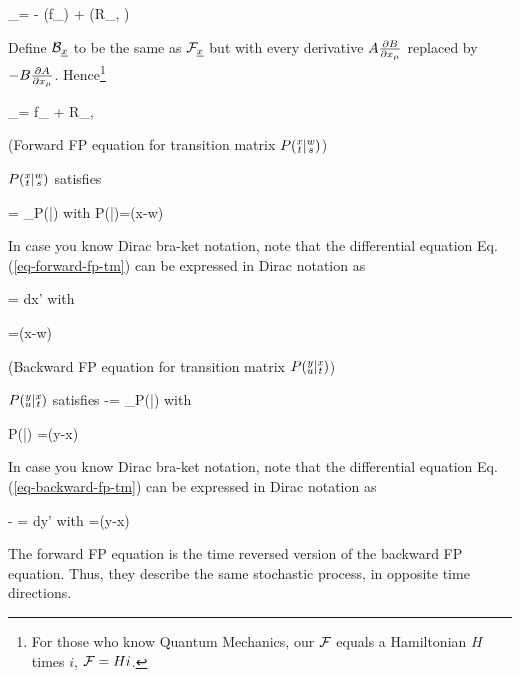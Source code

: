 \beq
\calf_\rvx \bullet=
-\;
(\bullet f_\mu) + 
(\bullet R_{\mu, \nu})
\eeq

Define $\calb_\rvx$ to be the same as $\calf_\rvx$
but with every derivative $A\frac{\partial B}{\partial x_\mu}$
replaced by $-B\frac{\partial A}{\partial x_\mu}$. Hence\footnote{For those
	who know Quantum Mechanics, our ${\cal F}$ equals 
	a Hamiltonian $H$ times $i$, ${\cal F} =Hi$.
}

\beq
\calb_\rvx \bullet=
f_\mu{}
 + R_{\mu, \nu}
\eeq



\begin{claim} (Forward FP equation for transition matrix $ P({\substack{x\\t}}|{\substack{w\\s}})$)

$ P({\substack{x\\t}}|{\substack{w\\s}})$ satisfies
	
\beq
{}=
\calf_\rvx P(|)
\label{eq-forward-fp-tm}
\eeq
with
\beq
P(|)=\delta(x-w)
\eeq

In case you know Dirac bra-ket notation,
note that the
differential
equation Eq.(\ref{eq-forward-fp-tm})
 can be expressed in Dirac notation as

\beq
{}
=\int 
{}dx'
\eeq
with

\beq
{} =\delta(x-w)
\quad {}
\eeq
\end{claim}


	
	
\begin{claim} (Backward FP equation for transition matrix $P({\substack{y\\u}}|{\substack{x\\t}})$)

$P({\substack{y\\u}}|{\substack{x\\t}})$ satisfies
\beq
-\;=
\calb_\rvx P(|)
\label{eq-backward-fp-tm}
\eeq
with

\beq
P(|) =\delta(y-x)
\eeq

In case you know Dirac bra-ket notation,
note that the
differential
equation Eq.(\ref{eq-backward-fp-tm})
 can be expressed in Dirac notation as

\beq
-\; 
=\int 
{}dy'
\eeq
with
\beq
{}=\delta(y-x)
\quad {}
\eeq
	
\end{claim}

The forward FP equation is the
time reversed version of the 
backward FP equation. Thus, they describe 
the same stochastic process,
in opposite time directions.

